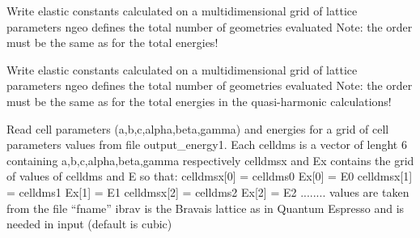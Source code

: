 \documentclass[letterpaper,10pt,english]{sphinxmanual}
\begin{document}
\begin{fulllineitems}
\label{pyqha:pyqha.write.write_CT}
Write elastic constants calculated on a multidimensional grid of lattice parameters
ngeo defines the total number of geometries evaluated
Note: the order must be the same as for the total energies!

\end{fulllineitems}


\begin{fulllineitems}
\label{pyqha:pyqha.write.write_C_geo}
Write elastic constants calculated on a multidimensional grid of lattice parameters
ngeo defines the total number of geometries evaluated
Note: the order must be the same as for the total energies in the quasi-harmonic calculations!

\end{fulllineitems}


\begin{fulllineitems}
\label{pyqha:pyqha.write.write_Etot}
Read cell parameters (a,b,c,alpha,beta,gamma) and energies for a grid of cell
parameters values from file output\_energy1. 
Each celldms is a vector of lenght 6 containing a,b,c,alpha,beta,gamma respectively
celldmsx and Ex contains the grid of values of celldms and E so that:
celldmsx{[}0{]} = celldms0      Ex{[}0{]} = E0
celldmsx{[}1{]} = celldms1      Ex{[}1{]} = E1
celldmsx{[}2{]} = celldms2      Ex{[}2{]} = E2
........
values are taken from the file ``fname''
ibrav is the Bravais lattice as in Quantum Espresso and is needed in input (default is cubic)

\end{fulllineitems}


\begin{fulllineitems}
\label{pyqha:pyqha.write.write_alphaT}
\end{fulllineitems}
\end{document}
